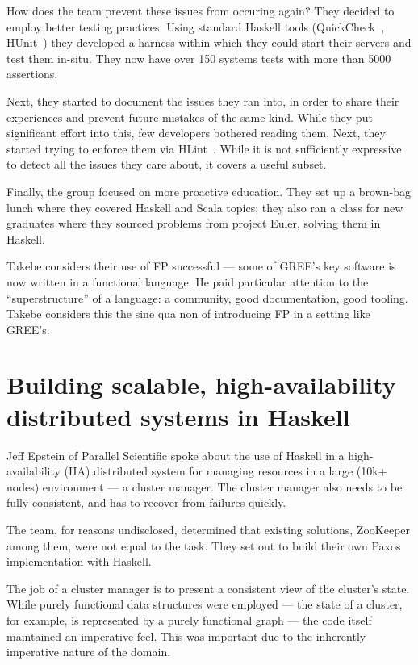 \documentclass{jfp1}
\begin{document}
How does the team prevent these issues from occuring again? They
decided to employ better testing practices. Using standard Haskell
tools (QuickCheck~\cite{Claessen:2011:Quickcheck},
HUnit~\cite{Herington:2014:HUnit}) they developed a harness within
which they could start their servers and test them in-situ. They now
have over 150 systems tests with more than 5000 assertions.

Next, they started to document the issues they ran into, in order to
share their experiences and prevent future mistakes of the same kind.
While they put significant effort into this, few developers bothered
reading them. Next, they started trying to enforce them via
HLint~\cite{Mitchell:2014:HLint}. While it is not sufficiently
expressive to detect all the issues they care about, it covers a
useful subset.

Finally, the group focused on more proactive education. They set up a
brown-bag lunch where they covered Haskell and Scala topics; they also
ran a class for new graduates where they sourced problems from project
Euler, solving them in Haskell.

Takebe considers their use of FP successful --- some of GREE's key
software is now written in a functional language. He paid particular
attention to the ``superstructure'' of a language: a community, good
documentation, good tooling. Takebe considers this the sine qua non
of introducing FP in a setting like GREE's.

\section{Building scalable, high-availability distributed systems in Haskell}


Jeff Epstein of Parallel Scientific spoke about the use of Haskell in
a high-availability (HA) distributed system for managing resources in
a large (10k+ nodes) environment --- a cluster manager. The cluster
manager also needs to be fully consistent, and has to recover from
failures quickly.

The team, for reasons undisclosed, determined that existing solutions,
ZooKeeper among them, were not equal to the task. They set out to
build their own Paxos~\cite{Lamport:1998:Part} implementation with Haskell.

The job of a cluster manager is to present a consistent view of the
cluster's state. While purely functional data structures were employed
--- the state of a cluster, for example, is represented by a purely
functional graph --- the code itself maintained an imperative feel.
This was important due to the inherently imperative nature of the
domain.
\end{document}
